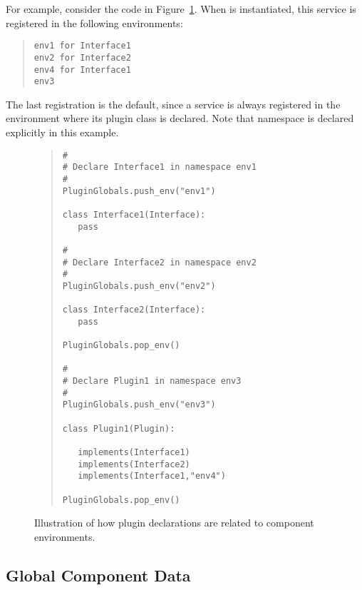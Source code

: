 For example, consider the code in Figure~\ref{fig:env1}.
When  is instantiated, this service is registered in the 
following environments:
\begin{quotation}
\begin{lstlisting}
env1 for Interface1
env2 for Interface2
env4 for Interface1
env3
\end{lstlisting}
\end{quotation}
The last registration is the default, since a service is always
registered in the environment where its plugin class is declared.
Note that  namespace is declared explicitly in this example.


\begin{figure}
\begin{quotation}
\begin{lstlisting}
#
# Declare Interface1 in namespace env1
#
PluginGlobals.push_env("env1")

class Interface1(Interface):
   pass

#
# Declare Interface2 in namespace env2
#
PluginGlobals.push_env("env2")

class Interface2(Interface):
   pass

PluginGlobals.pop_env()

#
# Declare Plugin1 in namespace env3
#
PluginGlobals.push_env("env3")

class Plugin1(Plugin):

   implements(Interface1)
   implements(Interface2)
   implements(Interface1,"env4")

PluginGlobals.pop_env()
\end{lstlisting}
\end{quotation}
\caption{\label{fig:env1} Illustration of how plugin declarations are related to component environments.}
\end{figure}


\subsection{Global Component Data}

